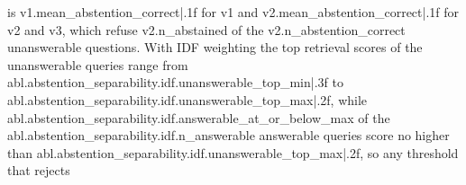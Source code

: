 is {{v1.mean_abstention_correct|.1f}} for v1 and {{v2.mean_abstention_correct|.1f}} for v2 and v3, which refuse {{v2.n_abstained}} of the {{v2.n_abstention_correct}}
unanswerable questions. With IDF weighting the top retrieval scores of the
unanswerable queries range from {{abl.abstention_separability.idf.unanswerable_top_min|.3f}} to {{abl.abstention_separability.idf.unanswerable_top_max|.2f}}, while {{abl.abstention_separability.idf.answerable_at_or_below_max}} of the {{abl.abstention_separability.idf.n_answerable}}
answerable queries score no higher than {{abl.abstention_separability.idf.unanswerable_top_max|.2f}}, so any threshold that rejects
